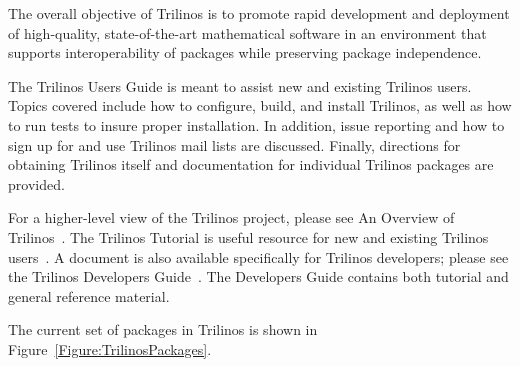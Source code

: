 \documentclass[12pt,relax]{TrilinosUserGuide}
\begin{document}
The overall objective of Trilinos is to promote rapid development and
deployment of high-quality, state-of-the-art mathematical software in
an environment that supports interoperability of packages while
preserving package independence. 

The Trilinos Users Guide is meant to assist new and existing
Trilinos users.  Topics covered include how to configure, build, and install
Trilinos, as well as how to run tests to insure proper installation.  In 
addition, issue reporting and how to sign up for and use Trilinos mail lists 
are discussed.  Finally, directions for obtaining Trilinos itself and 
documentation for individual Trilinos packages are provided.


For a higher-level view of the Trilinos project, please see An Overview
of Trilinos~\cite{Trilinos-Overview}.  The Trilinos Tutorial is useful
resource for new and existing Trilinos users~\cite{Trilinos-Tutorial}.  A
document is also available specifically for Trilinos developers; please see
the Trilinos Developers Guide~\cite{Trilinos-Dev-Guide}.  The Developers
Guide contains both tutorial and general reference material.  

The current set of packages in Trilinos is shown in 
Figure~\ref{Figure:TrilinosPackages}.
\end{document}
